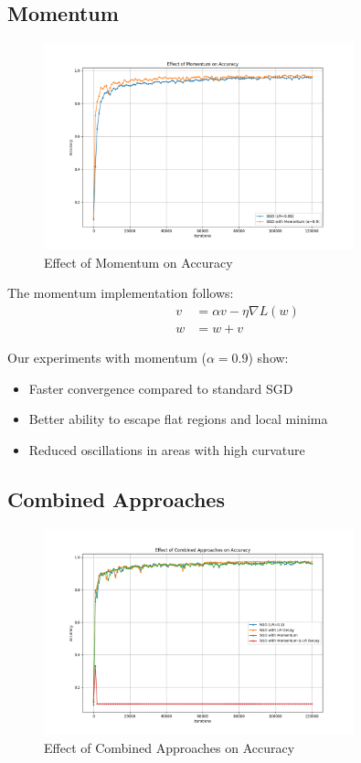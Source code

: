 \documentclass{article}
\begin{document}
\subsection{Momentum}
\begin{figure}[h]
\centering
\includegraphics[width=0.8\textwidth]{plots/part2c_momentum_accuracy.png}
\caption{Effect of Momentum on Accuracy}
\end{figure}

The momentum implementation follows:
\begin{align}
v &= \alpha v - \eta \nabla L(w) \\
w &= w + v
\end{align}

Our experiments with momentum ($\alpha = 0.9$) show:
\begin{itemize}
    \item Faster convergence compared to standard SGD
    \item Better ability to escape flat regions and local minima
    \item Reduced oscillations in areas with high curvature
\end{itemize}

\subsection{Combined Approaches}
\begin{figure}[h]
\centering
\includegraphics[width=0.8\textwidth]{plots/part2d_combined_accuracy.png}
\caption{Effect of Combined Approaches on Accuracy}
\end{figure}
\end{document}
